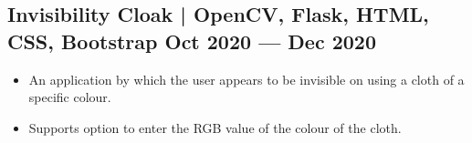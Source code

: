 \documentclass[10pt]{article}
\newenvironment{zitemize}{
\begin{itemize}\itemsep2pt \parskip0pt \parsep1pt}
{\end{itemize}\vspace{-0.7cm}}
\begin{document}
\subsection*{Invisibility Cloak | OpenCV, Flask, HTML, CSS, Bootstrap \hfill Oct 2020 --- Dec 2020} 
    \begin{zitemize}
        \item An application by which the user appears to be invisible on using a cloth of a specific colour.
        \item Supports option to enter the RGB value of the colour of the cloth.
    \end{zitemize}




\end{document}
